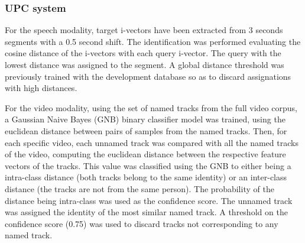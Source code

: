 \subsubsection{UPC system}

For the speech modality, target i-vectors have been extracted from 3 seconds segments with a 0.5 second shift. The identification was performed evaluating the cosine distance of the i-vectors with each query i-vector. The query with the lowest distance was assigned to the segment. A global distance threshold was previously trained with the development database so as to discard assignations with high distances.

For the video modality, using the set of named tracks from the full video corpus, a Gaussian Naive Bayes (GNB) binary classifier model was trained, using the euclidean distance between pairs of samples from the named tracks. Then, for each specific video, each unnamed track was compared with all the named tracks of the video, computing the euclidean distance between the respective feature vectors of the tracks. This value was classified using the GNB to either being a intra-class distance (both tracks belong to the same identity) or an inter-class distance (the tracks are not from the same person). The probability of the distance being intra-class was used as the confidence score. The unnamed track was assigned the identity of the most similar named track. A threshold on the confidence score (0.75) was used to discard tracks not corresponding to any named track.

\endinput
